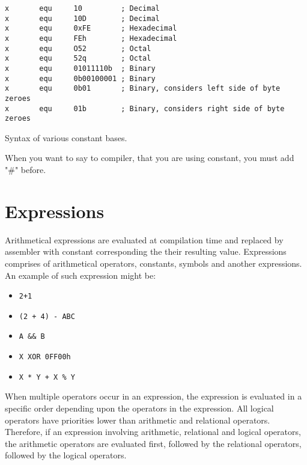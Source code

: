     \begin{code}[h!]
    {
        \usecodefont

        \verb'x       equ     10         ; Decimal'\\
        \verb'x       equ     10D        ; Decimal'\\
        \verb'x       equ     0xFE       ; Hexadecimal'\\
        \verb'x       equ     FEh        ; Hexadecimal'\\
        \verb'x       equ     O52        ; Octal'\\
        \verb'x       equ     52q        ; Octal'\\
        \verb'x       equ     01011110b  ; Binary'\\
        \verb'x       equ     0b00100001 ; Binary'\\
        \verb'x       equ     0b01       ; Binary, considers left side of byte zeroes'\\
        \verb'x       equ     01b        ; Binary, considers right side of byte zeroes'

        \caption{Syntax of various constant bases.}
        \label{code:svcb}
    }
    \end{code}

    When you want to say to compiler, that you are using constant, you must add "\#" before.

\clearpage
\section{Expressions}
    Arithmetical expressions are evaluated at compilation time and replaced by assembler with constant corresponding the their resulting value. Expressions comprises of arithmetical operators, constants, symbols and another expressions. An example of such expression might be:

    \begin{itemize}
        \item \texttt{2+1}
        \item \texttt{(2 + 4) - ABC}
        \item \texttt{A \&\& B}
        \item \texttt{X XOR 0FF00h}
        \item \texttt{X * Y + X \% Y}
    \end{itemize}

    When multiple operators occur in an expression, the expression is evaluated in a specific order depending upon the operators in the expression. All logical operators have priorities lower than arithmetic and relational operators. Therefore, if an expression involving arithmetic, relational and logical operators, the arithmetic operators are evaluated first, followed by the relational operators, followed by the logical operators.

